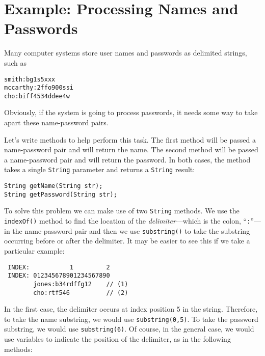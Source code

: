\section{Example: Processing Names and Passwords}
\noindent Many computer systems store user names and passwords as delimited
strings, such as

\begin{jjjlisting}
\begin{lstlisting}
smith:bg1s5xxx
mccarthy:2ffo900ssi
cho:biff4534ddee4w
\end{lstlisting}
\end{jjjlisting}


\noindent Obviously, if the system is going to process passwords,
it needs some way to take apart these name-password pairs.

Let's write methods to help perform this task.  The first method will
be passed a name-password pair and will return the name.  The second
method will be passed a name-password pair and will return the
password.  In both cases, the method takes a single {\tt String}
parameter and returns a {\tt String} result:

\begin{jjjlisting}
\begin{lstlisting}
String getName(String str);
String getPassword(String str);
\end{lstlisting}
\end{jjjlisting}

\noindent To solve this problem we can make use of two {\tt String} methods.  We
use the {\tt indexOf()} method to find the location of the {\it
delimiter}---which is the colon,  ``{\tt :}''---in the name-password pair
and then we use {\tt substring()} to take the substring occurring
before or after the delimiter.  It may be easier to see this if we
take a particular example:


\begin{jjjlisting}
\begin{lstlisting}
 INDEX:           1         2
 INDEX: 012345678901234567890
        jones:b34rdffg12    // (1)
        cho:rtf546          // (2)
\end{lstlisting}
\end{jjjlisting}

\noindent In the first case, the delimiter occurs at index position 5 in
the string.  Therefore, to take the name substring, we would use
{\tt substring(0,5)}. To take the password substring, we would
use {\tt substring(6)}.  Of course, in the general case, we would
use variables to indicate the position of the delimiter, as in the
following methods:

